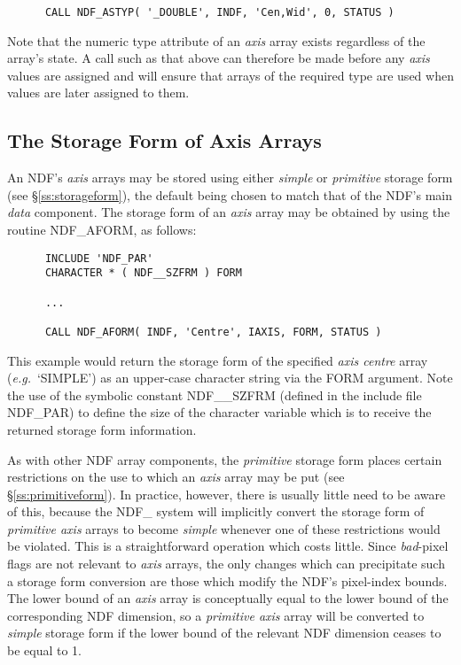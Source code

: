 \documentclass[twoside,11pt]{article}
\newcommand{\htmlref}[2]{#1}
\newcommand{\xlabel}[1]{}
\newcommand{\st}[1]{{\em{#1}}}
\begin{document}
\small
\begin{verbatim}
      CALL NDF_ASTYP( '_DOUBLE', INDF, 'Cen,Wid', 0, STATUS )
\end{verbatim}
\normalsize

Note that the numeric type attribute of an \st{axis\/} array exists 
regardless of the array's state. 
A call such as that above can therefore be made before any \st{axis\/}
values are assigned and will ensure that arrays of the required type are
used when values are later assigned to them. 

\subsection{\xlabel{the_storage_form_of_axis_arrays}The Storage Form of Axis Arrays}

An NDF's \st{axis\/} arrays may be stored using either \st{simple\/} or
\st{primitive\/} storage form (see \S\ref{ss:storageform}), the default
being chosen to match that of the NDF's main \st{data\/} component. 
The storage form of an \st{axis\/} array may be obtained by using the
routine \htmlref{NDF\_AFORM}{NDF_AFORM}, as follows: 

\small
\begin{verbatim}
      INCLUDE 'NDF_PAR'
      CHARACTER * ( NDF__SZFRM ) FORM

      ...

      CALL NDF_AFORM( INDF, 'Centre', IAXIS, FORM, STATUS )
\end{verbatim}
\normalsize

This example would return the storage form of the specified \st{axis
centre\/} array (\st{e.g.}\ `SIMPLE') as an upper-case character string via
the FORM argument. 
Note the use of the symbolic constant NDF\_\_SZFRM (defined in the include
file NDF\_PAR) to define the size of the character variable which is to
receive the returned storage form information. 

As with other NDF array components, the \st{primitive\/} storage form
places certain restrictions on the use to which an \st{axis\/} array may be
put (see \S\ref{ss:primitiveform}). 
In practice, however, there is usually little need to be aware of this,
because the NDF\_ system will implicitly convert the storage form of
\st{primitive axis\/} arrays to become \st{simple\/} whenever one of
these 
restrictions would be violated.
This is a straightforward operation which costs little. 
Since \st{bad\/}-pixel flags are not relevant to \st{axis\/} arrays, the
only changes which can precipitate such a storage form conversion are those
which modify the NDF's pixel-index bounds. 
The lower bound of an \st{axis\/} array is conceptually equal to the lower
bound of the corresponding NDF dimension, so a \st{primitive axis\/} array
will be converted to \st{simple\/} storage form if the lower bound of the
relevant NDF dimension ceases to be equal to 1. 
\end{document}
